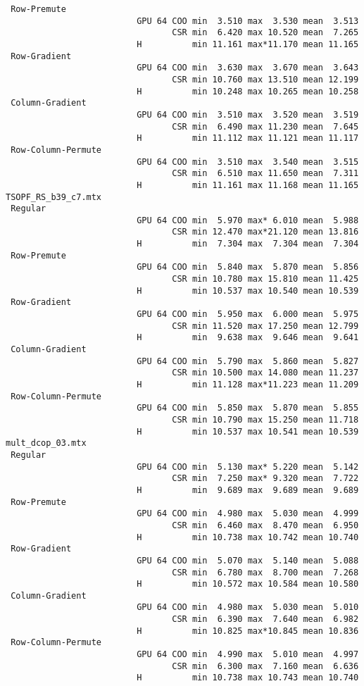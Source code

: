 {\begin{verbatim}
 Row-Premute
                          GPU 64 COO min  3.510 max  3.530 mean  3.513
                                 CSR min  6.420 max 10.520 mean  7.265
                          H          min 11.161 max*11.170 mean 11.165
 Row-Gradient
                          GPU 64 COO min  3.630 max  3.670 mean  3.643
                                 CSR min 10.760 max 13.510 mean 12.199
                          H          min 10.248 max 10.265 mean 10.258
 Column-Gradient
                          GPU 64 COO min  3.510 max  3.520 mean  3.519
                                 CSR min  6.490 max 11.230 mean  7.645
                          H          min 11.112 max 11.121 mean 11.117
 Row-Column-Permute
                          GPU 64 COO min  3.510 max  3.540 mean  3.515
                                 CSR min  6.510 max 11.650 mean  7.311
                          H          min 11.161 max 11.168 mean 11.165
TSOPF_RS_b39_c7.mtx
 Regular
                          GPU 64 COO min  5.970 max* 6.010 mean  5.988
                                 CSR min 12.470 max*21.120 mean 13.816
                          H          min  7.304 max  7.304 mean  7.304
 Row-Premute
                          GPU 64 COO min  5.840 max  5.870 mean  5.856
                                 CSR min 10.780 max 15.810 mean 11.425
                          H          min 10.537 max 10.540 mean 10.539
 Row-Gradient
                          GPU 64 COO min  5.950 max  6.000 mean  5.975
                                 CSR min 11.520 max 17.250 mean 12.799
                          H          min  9.638 max  9.646 mean  9.641
 Column-Gradient
                          GPU 64 COO min  5.790 max  5.860 mean  5.827
                                 CSR min 10.500 max 14.080 mean 11.237
                          H          min 11.128 max*11.223 mean 11.209
 Row-Column-Permute
                          GPU 64 COO min  5.850 max  5.870 mean  5.855
                                 CSR min 10.790 max 15.250 mean 11.718
                          H          min 10.537 max 10.541 mean 10.539
mult_dcop_03.mtx
 Regular
                          GPU 64 COO min  5.130 max* 5.220 mean  5.142
                                 CSR min  7.250 max* 9.320 mean  7.722
                          H          min  9.689 max  9.689 mean  9.689
 Row-Premute
                          GPU 64 COO min  4.980 max  5.030 mean  4.999
                                 CSR min  6.460 max  8.470 mean  6.950
                          H          min 10.738 max 10.742 mean 10.740
 Row-Gradient
                          GPU 64 COO min  5.070 max  5.140 mean  5.088
                                 CSR min  6.780 max  8.700 mean  7.268
                          H          min 10.572 max 10.584 mean 10.580
 Column-Gradient
                          GPU 64 COO min  4.980 max  5.030 mean  5.010
                                 CSR min  6.390 max  7.640 mean  6.982
                          H          min 10.825 max*10.845 mean 10.836
 Row-Column-Permute
                          GPU 64 COO min  4.990 max  5.010 mean  4.997
                                 CSR min  6.300 max  7.160 mean  6.636
                          H          min 10.738 max 10.743 mean 10.740
\end{verbatim}
}
